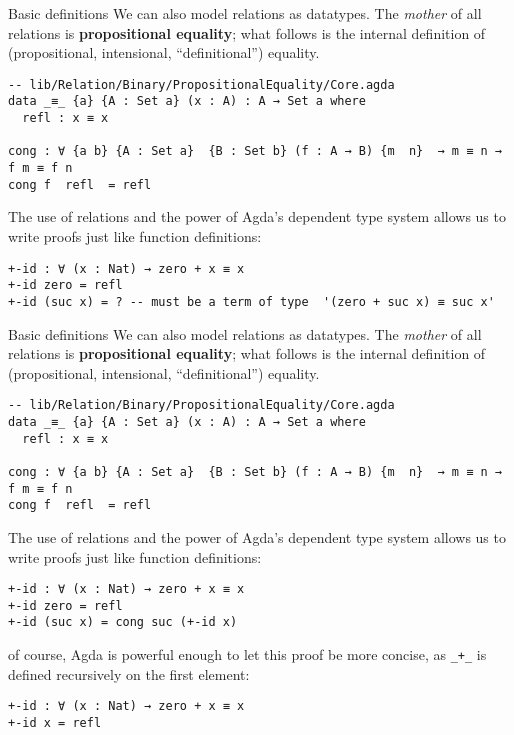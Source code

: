 \documentclass[t,aspectratio=169,9pt]{beamer}
\begin{document}
\begin{frame}[fragile]{Basic definitions}
  We can also model relations as datatypes. The {\it mother} of all relations is
  {\bf propositional equality}; what follows is the internal definition of
  (propositional, intensional, ``definitional'') equality.
\begin{verbatim}
-- lib/Relation/Binary/PropositionalEquality/Core.agda
data _≡_ {a} {A : Set a} (x : A) : A → Set a where
  refl : x ≡ x

cong : ∀ {a b} {A : Set a}  {B : Set b} (f : A → B) {m  n}  → m ≡ n → f m ≡ f n
cong f  refl  = refl
\end{verbatim}
The use of relations and the power of Agda's dependent type system allows us to
write proofs just like function definitions:
\begin{verbatim}
+-id : ∀ (x : Nat) → zero + x ≡ x
+-id zero = refl
+-id (suc x) = ? -- must be a term of type  '(zero + suc x) ≡ suc x'
\end{verbatim}
\end{frame}

\begin{frame}[fragile]{Basic definitions}
  We can also model relations as datatypes. The {\it mother} of all relations is
  {\bf propositional equality}; what follows is the internal definition of
  (propositional, intensional, ``definitional'') equality.
\begin{verbatim}
-- lib/Relation/Binary/PropositionalEquality/Core.agda
data _≡_ {a} {A : Set a} (x : A) : A → Set a where
  refl : x ≡ x

cong : ∀ {a b} {A : Set a}  {B : Set b} (f : A → B) {m  n}  → m ≡ n → f m ≡ f n
cong f  refl  = refl
\end{verbatim}
The use of relations and the power of Agda's dependent type system allows us to
write proofs just like function definitions:
\begin{verbatim}
+-id : ∀ (x : Nat) → zero + x ≡ x
+-id zero = refl
+-id (suc x) = cong suc (+-id x)
\end{verbatim}
of course, Agda is powerful enough to let this proof be more concise, as
\texttt{_+_} is defined recursively on the first element:
\begin{verbatim}
+-id : ∀ (x : Nat) → zero + x ≡ x
+-id x = refl
\end{verbatim}
\end{frame}
\end{document}

